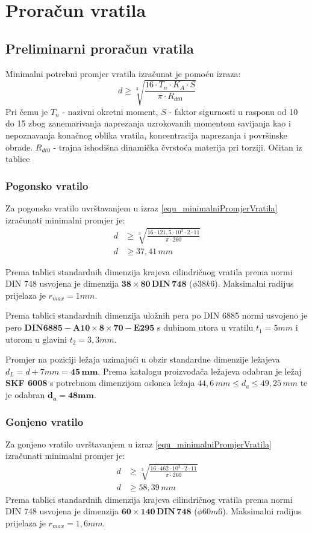 \documentclass[11pt,a4paper]{report}
\begin{document}
\section{Proračun vratila}
\subsection{Preliminarni proračun vratila}
Minimalni potrebni promjer vratila izračunat je pomoću izraza:
\begin{equation}
d\geq \sqrt[3]{\frac{16 \cdot T_n \cdot K_A \cdot S}{\pi \cdot R_{dt0}}}\label{equ_minimalniPromjerVratila}
\end{equation}
Pri čemu je $T_n$ - nazivni okretni moment,
$S$ - faktor sigurnosti u rasponu od 10 do 15 zbog zanemarivanja naprezanja uzrokovanih momentom savijanja kao i nepoznavanja konačnog oblika vratila, koncentracija naprezanja i površinske obrade.
$R_{dt0}$ - trajna ishodišna dinamička čvrstoća materija pri torziji. Očitan iz tablice \cite{krivzan1998osnove}

\subsubsection{Pogonsko vratilo}
Za pogonsko vratilo uvrštavanjem u izraz \eqref{equ_minimalniPromjerVratila} izračunati minimalni promjer je:
\begin{align*}
d&\geq \sqrt[3]{\frac{16 \cdot 121,5 \cdot 10^3 \cdot 2 \cdot 11}{\pi \cdot 260}}\\
d&\geq 37,41 \,mm
\end{align*}

Prema tablici\cite{potrebniMaterijali} standardnih dimenzija krajeva cilindričnog vratila prema normi DIN 748 usvojena je dimenzija $\mathbf{38 \times 80 \,DIN \,748}$ ($\phi38k6$).
Maksimalni radijus prijelaza je $r_{max}=1 mm$.

Prema tablici standardnih dimenzija uložnih pera\cite{potrebniMaterijali} po DIN 6885 normi usvojeno je pero $\mathbf{DIN6885-A 10 \times 8 \times 70-E295}$ s dubinom utora u vratilu $t_1=5mm$ i utorom u glavini $t_2=3,3mm$.

Promjer na poziciji ležaja uzimajući u obzir standardne dimenzije ležajeva $d_L=d+7mm= \mathbf{45 \,mm}$.
Prema katalogu proizvođača ležajeva\cite{skf} odabran je ležaj \textbf{SKF 6008} s potrebnom dimenzijom oslonca ležaja $44,6 \, mm \leq d_a \leq 49,25 \, mm$ te je odabran $\mathbf{d_a=48mm}$.

\subsubsection{Gonjeno vratilo}
Za gonjeno vratilo uvrštavanjem u izraz \eqref{equ_minimalniPromjerVratila} izračunati minimalni promjer je:
\begin{align*}
d&\geq \sqrt[3]{\frac{16 \cdot 462 \cdot 10^3 \cdot 2 \cdot 11}{\pi \cdot 260}}\\
d&\geq 58,39 \,mm
\end{align*}
Prema tablici\cite{potrebniMaterijali} standardnih dimenzija krajeva cilindričnog vratila prema normi DIN 748 usvojena je dimenzija $\mathbf{60 \times 140 \,DIN \, 748}$ ($\phi60m6$).
Maksimalni radijus prijelaza je $r_{max}=1,6 mm$.
\end{document}
